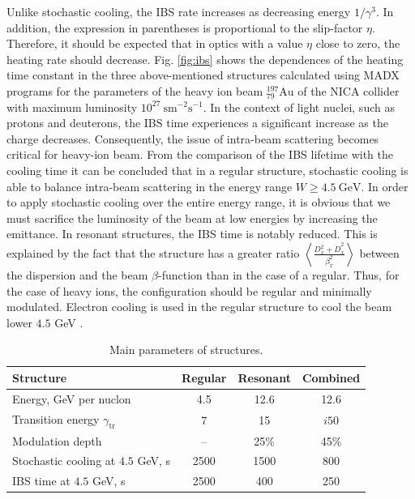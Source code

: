 \documentclass[submitting]{nst}
\begin{document}
\noindent Unlike stochastic cooling, the IBS rate increases as decreasing energy $1/\gamma^3$. In addition, the expression in parentheses is proportional to the slip-factor $\eta$. Therefore, it should be expected that in optics with a value $\eta$ close to zero, the heating rate should decrease. Fig. \ref{fig:ibs} shows the dependences of the heating time constant in the three above-mentioned structures calculated using MADX programs \cite{b10} for the parameters of the heavy ion beam ${_{79}^{197}}\text{Au}$ of the NICA collider with maximum luminosity ${10}^{27}\ {\text{sm}}^{-2}\text{s}^{-1}$. In the context of light nuclei, such as protons and deuterons, the IBS time experiences a significant increase as the charge decreases. Consequently, the issue of intra-beam scattering becomes critical for heavy-ion beam.
From the comparison of the IBS lifetime with the cooling time it can be concluded that in a regular structure, stochastic cooling is able to balance intra-beam scattering in the energy range $W\geq4.5\ \text{GeV}$. In order to apply stochastic cooling over the entire energy range, it is obvious that we must sacrifice the luminosity of the beam at low energies by increasing the emittance. In resonant structures, the IBS time is notably reduced. This is explained by the fact that the structure has a greater ratio $\left\langle\frac{D_x^2+{\dot{D}}_x^2}{\beta_x^2}\right\rangle$ between the dispersion and the beam $\beta$-function than in the case of a regular. Thus, for the case of heavy ions, the configuration should be regular and minimally modulated. Electron cooling is used in the regular structure to cool the beam lower $4.5$ GeV \cite{b11, b12}.

\begin{table}[!htb]
\caption{Main parameters of structures.}
\label{tab:dual}
\begin{tabular*}{8cm} {@{\extracolsep{\fill} } lccc}
\toprule
Structure & Regular & Resonant & Combined \\
\midrule
Energy, GeV per nuclon & 4.5 & 12.6 & 12.6 \\
Transition energy $\gamma_{\text{tr}}$  & 7 & 15 & $i50$ \\
Modulation depth & -- & 25\% & 45\% \\
Stochastic cooling at $4.5$ GeV, s & 2500 & 1500 & 800 \\
IBS time at $4.5$ GeV, s & 2500 & 400 & 250 \\
\bottomrule
\end{tabular*}
\end{table}
\end{document}
